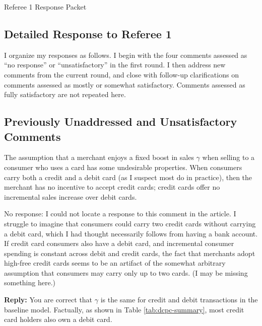 \documentclass[main.tex]{subfiles}
\begin{document}
\clearpage

{\color{white}\fontsize{1}{1}\selectfont Referee 1 Response Packet}

\newpage

\begin{refsection}

\section*{Detailed Response to Referee 1}

I organize my responses as follows.
I begin with the four comments assessed as ``no response'' or ``unsatisfactory'' in the first round. I then address new comments from the current round, and close with follow-up clarifications on comments assessed as mostly or somewhat satisfactory.
Comments assessed as fully satisfactory are not repeated here.

\subsection*{Previously Unaddressed and Unsatisfactory Comments}

\begin{refcommentnoclear}
The assumption that a merchant enjoys a fixed boost in sales $\gamma$ when selling to a consumer who uses a card has some undesirable properties.
When consumers carry both a credit and a debit card (as I suspect most do in practice), then the merchant has no incentive to accept credit cards; credit cards offer no incremental sales increase over debit cards.

No response: I could not locate a response to this comment in the article.
I struggle to imagine that consumers could carry two credit cards without carrying a debit card, which I had thought necessarily follows from having a bank account.
If credit card consumers also have a debit card, and incremental consumer spending is constant across debit and credit cards, the fact that merchants adopt high-free credit cards seems to be an artifact of the somewhat arbitrary assumption that consumers may carry only up to two cards.
(I may be missing something here.)

\end{refcommentnoclear}

\textbf{Reply:} You are correct that $\gamma$ is the same for credit and debit transactions in the baseline model. 
Factually, as shown in Table \ref{tab:dcpc-summary}, most credit card holders also own a debit card.


\end{refsection}
\end{document}
